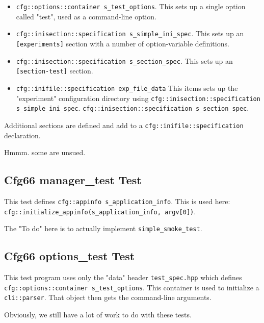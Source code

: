     \begin{itemize}
      \item \texttt{cfg::options::container s\_test\_options}.
         This sets up a single option called "test",
         used as a command-line option.
      \item \texttt{cfg::inisection::specification s\_simple\_ini\_spec}.
         This sets up an \texttt{[experiments]} section with a number of
         option-variable definitions.
      \item \texttt{cfg::inisection::specification s\_section\_spec}.
         This sets up an \texttt{[section-test]} section.
      \item \texttt{cfg::inifile::specification exp\_file\_data}
         This items sets up the "experiment" configuration directory
         using
         \texttt{cfg::inisection::specification s\_simple\_ini\_spec}.
         \texttt{cfg::inisection::specification s\_section\_spec}.
    \end{itemize}

    Additional sections are defined and add to a
    \texttt{cfg::inifile::specification} declaration.

    Hmmm. some are unsued.

\subsection{Cfg66 manager\_test Test}
\label{subsec:cfg66_tests_manager_test}

   This test defines 
   \texttt{cfg::appinfo s\_application\_info}.
   This is used here:
   \texttt{cfg::initialize\_appinfo(s\_application\_info, argv[0])}.

   The "To do" here is to actually implement \texttt{simple\_smoke\_test}.

\subsection{Cfg66 options\_test Test}
\label{subsec:cfg66_tests_options_test}

   This test program uses only the "data" header
   \texttt{test\_spec.hpp} which defines
   \texttt{cfg::options::container s\_test\_options}.
   This container is used to initialize a
   \texttt{cli::parser}.
   That object then gets the command-line arguments.

   Obviously, we still have a lot of work to do with these tests.

